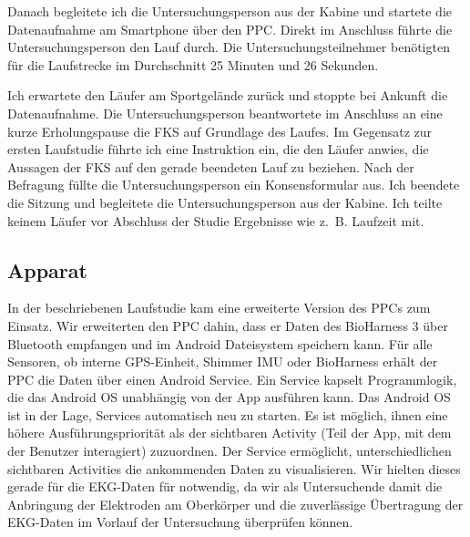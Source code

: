 Danach begleitete ich die Untersuchungsperson aus der Kabine und startete die Datenaufnahme am Smartphone über den \ac{PPC}. Direkt im Anschluss führte die Untersuchungsperson den Lauf durch. Die Untersuchungsteilnehmer benötigten für die Laufstrecke im Durchschnitt 25 Minuten und 26 Sekunden. 

Ich erwartete den Läufer am Sportgelände zurück und stoppte bei Ankunft die Datenaufnahme. Die Untersuchungsperson beantwortete im Anschluss an eine kurze Erholungspause die \ac{FKS} auf Grundlage des Laufes. Im Gegensatz zur ersten Laufstudie führte ich eine Instruktion ein, die den Läufer anwies, die Aussagen der \ac{FKS} auf den gerade beendeten Lauf zu beziehen. Nach der Befragung füllte die Untersuchungsperson ein Konsensformular aus. Ich beendete die Sitzung und begleitete die Untersuchungsperson aus der Kabine. Ich teilte keinem Läufer vor Abschluss der Studie Ergebnisse wie z.~B. Laufzeit mit. 

\subsection{Apparat} 

\label{sub:apparat}

In der beschriebenen Laufstudie kam eine erweiterte Version des \ac{PPC}s zum Einsatz. Wir erweiterten den \ac{PPC} dahin, dass er Daten des BioHarness 3 über Bluetooth empfangen und im Android Dateisystem speichern kann. Für alle Sensoren, ob interne \acs{GPS}-Einheit, Shimmer \ac{IMU} oder BioHarness erhält der \ac{PPC} die Daten über einen Android Service. Ein Service kapselt Programmlogik, die das Android OS unabhängig von der App ausführen kann. Das Android OS ist in der Lage, Services automatisch neu zu starten. Es ist möglich, ihnen eine höhere Ausführungspriorität als der sichtbaren Activity (Teil der App, mit dem der Benutzer interagiert) zuzuordnen. Der Service ermöglicht, unterschiedlichen sichtbaren Activities die ankommenden Daten zu visualisieren. Wir hielten dieses gerade für die \ac{EKG}-Daten für notwendig, da wir als Untersuchende damit die Anbringung der Elektroden am Oberkörper und die zuverlässige Übertragung der \ac{EKG}-Daten im Vorlauf der Untersuchung überprüfen können. 

